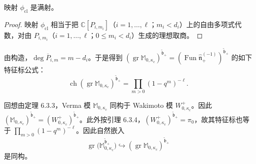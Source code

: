 
\begin{corollary}
    映射 $\phi_{\mathrm{cl}}$ 是满射。
\end{corollary}

\begin{proof}
映射 $\phi_{\mathrm{cl}}$ 相当于把 $\mathbb C[P_{i,m_i}]$（$i=1,\dots,\ell$；$m_i<d_i$）上的自由多项式代数，对由 $P_{i,m_i}$（$i=1,\dots,\ell$；$0\le m_i<d_i$）生成的理想取商。
\end{proof}

由构造，$\deg\overline P_{i,m}=m-d_i$。于是得到 $(\operatorname{gr}\mathbb M_{0,\kappa_c})^{\tilde{\mathfrak b}_+}=(\operatorname{Fun}\hat{\mathfrak n}^{(-1)}_+)^{\tilde{\mathfrak b}_+}$ 的如下特征标公式：
\[
    \operatorname{ch}(\operatorname{gr}\mathbb M_{0,\kappa_c})^{\tilde{\mathfrak b}_+}=\prod_{m>0}(1-q^m)^{-\ell}.
\]

回想由定理 6.3.3，Verma 模 $\mathbb M_{0,\kappa_c}$ 同构于 Wakimoto 模 $W^+_{0,\kappa_c}$。因此 $(\mathbb M_{0,\kappa_c})^{\tilde{\mathfrak b}_+}=(W^+_{0,\kappa_c})^{\tilde{\mathfrak b}_+}$。此外按引理 6.3.4，$(W^+_{0,\kappa_c})^{\tilde{\mathfrak b}_+}=\pi_0$，故其特征标也等于 $\prod_{m>0}(1-q^m)^{-\ell}$。因此自然嵌入
\[
    \operatorname{gr}\bigl(\mathbb M^{\tilde{\mathfrak b}_+}_{0,\kappa_c}\bigr)\hookrightarrow(\operatorname{gr}\mathbb M_{0,\kappa_c})^{\tilde{\mathfrak b}_+}
\]
是同构。

